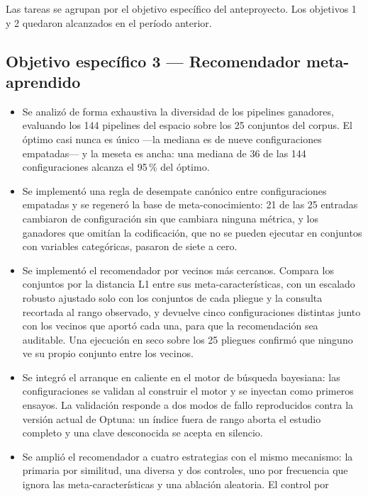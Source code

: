 \documentclass[11pt,letterpaper]{article}
\begin{document}
Las tareas se agrupan por el objetivo específico del anteproyecto. Los objetivos 1 y 2
quedaron alcanzados en el período anterior.

\subsection{Objetivo específico 3 --- Recomendador meta-aprendido}

\begin{itemize}
  \item Se analizó de forma exhaustiva la diversidad de los pipelines ganadores,
        evaluando los 144 pipelines del espacio sobre los 25 conjuntos del corpus. El
        óptimo casi nunca es único ---la mediana es de nueve configuraciones empatadas---
        y la meseta es ancha: una mediana de 36 de las 144 configuraciones alcanza el
        95\,\% del óptimo.
  \item Se implementó una regla de desempate canónico entre configuraciones empatadas y
        se regeneró la base de meta-conocimiento: 21 de las 25 entradas cambiaron de
        configuración sin que cambiara ninguna métrica, y los ganadores que omitían la
        codificación, que no se pueden ejecutar en conjuntos con variables categóricas,
        pasaron de siete a cero.
  \item Se implementó el recomendador por vecinos más cercanos. Compara los conjuntos por
        la distancia L1 entre sus meta-características, con un escalado robusto ajustado
        solo con los conjuntos de cada pliegue y la consulta recortada al rango
        observado, y devuelve cinco configuraciones distintas junto con los vecinos que
        aportó cada una, para que la recomendación sea auditable. Una ejecución en seco
        sobre los 25 pliegues confirmó que ninguno ve su propio conjunto entre los
        vecinos.
  \item Se integró el arranque en caliente en el motor de búsqueda bayesiana: las
        configuraciones se validan al construir el motor y se inyectan como primeros
        ensayos. La validación responde a dos modos de fallo reproducidos contra la
        versión actual de Optuna: un índice fuera de rango aborta el estudio completo y
        una clave desconocida se acepta en silencio.
  \item Se amplió el recomendador a cuatro estrategias con el mismo mecanismo: la
        primaria por similitud, una diversa y dos controles, uno por frecuencia que
        ignora las meta-características y una ablación aleatoria. El control por

\end{itemize}
\end{document}
